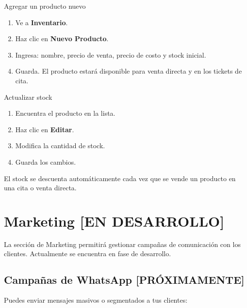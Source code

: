 \documentclass[12pt,a4paper]{article}
\begin{document}
\begin{pasobox}{Agregar un producto nuevo}
\begin{enumerate}[leftmargin=*]
  \item Ve a \textbf{Inventario}.
  \item Haz clic en \textbf{Nuevo Producto}.
  \item Ingresa: nombre, precio de venta, precio de costo y stock inicial.
  \item Guarda. El producto estará disponible para venta directa y en los tickets de cita.
\end{enumerate}
\end{pasobox}

\begin{pasobox}{Actualizar stock}
\begin{enumerate}[leftmargin=*]
  \item Encuentra el producto en la lista.
  \item Haz clic en \textbf{Editar}.
  \item Modifica la cantidad de stock.
  \item Guarda los cambios.
\end{enumerate}
\end{pasobox}

\begin{notabox}
El stock se descuenta automáticamente cada vez que se vende un producto en una cita o venta directa.
\end{notabox}

\newpage
\section{Marketing [EN DESARROLLO]}

La sección de Marketing permitirá gestionar campañas de comunicación con los clientes. Actualmente se encuentra en fase de desarrollo.

\subsection{Campañas de WhatsApp [PRÓXIMAMENTE]}

Puedes enviar mensajes masivos o segmentados a tus clientes:
\end{document}
